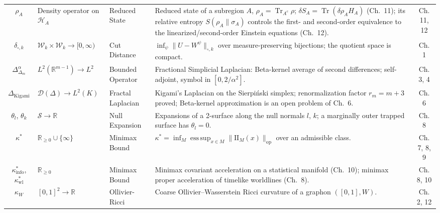 \documentclass[11pt,a4paper,oneside]{article}
\newcommand{\II}{\mathrm{II}}
\begin{document}
\begin{table}[!htbp]
\begin{tabularx}{\textwidth}{@{} c p{3.0cm} p{2.6cm} X c @{}}
$\rho_A$ & Density operator on $\mathcal{H}_A$ & Reduced State & Reduced state of a subregion $A$, $\rho_A = \operatorname{Tr}_{A^c}\rho$; $\delta S_A = \operatorname{Tr}(\delta\rho_A H_A)$ (Ch.~11); its relative entropy $S(\rho_A\|\sigma_A)$ controls the first- and second-order equivalence to the linearized/second-order Einstein equations (Ch.~12). & Ch. 11, 12 \\
$\delta_{\square,k}$ & $\mathcal{W}_k \times \mathcal{W}_k \to [0,\infty)$ & Cut Distance & $\inf_\psi \|U - W^\psi\|_{\square,k}$ over measure-preserving bijections; the quotient space is compact. & Ch. 1 \\
$\Delta_{\Delta_m}^\alpha$ & $L^2(\mathbb{R}^{m-1}) \to L^2$ & Bounded Operator & Fractional Simplicial Laplacian: Beta-kernel average of second differences; self-adjoint, symbol in $[0, 2/\alpha^2]$. & Ch. 3, 4 \\
$\Delta_{\mathrm{Kigami}}$ & $\mathcal{D}(\Delta) \to L^2(K)$ & Fractal Laplacian & Kigami's Laplacian on the Sierpi\'nski simplex; renormalization factor $r_m = m+3$ proved; Beta-kernel approximation is an open problem of Ch.~6. & Ch. 6 \\
$\theta_l$, $\theta_k$ & $\mathcal{S} \to \mathbb{R}$ & Null Expansion & Expansions of a 2-surface along the null normals $l$, $k$; a marginally outer trapped surface has $\theta_l = 0$. & Ch. 8 \\
$\kappa^*$ & $\mathbb{R}_{\ge0} \cup \{\infty\}$ & Minimax Bound & $\kappa^* = \inf_{M} \operatorname{ess\,sup}_{x \in M} \|\II_M(x)\|_{\mathrm{op}}$ over an admissible class. & Ch. 7, 8, 9 \\
$\kappa^*_{\mathrm{info}}$, $\kappa^*_{\mathrm{wl}}$ & $\mathbb{R}_{\ge 0}$ & Minimax Bound & Minimax covariant acceleration on a statistical manifold (Ch.~10); minimax proper acceleration of timelike worldlines (Ch.~8). & Ch. 8, 10 \\
$\kappa_W$ & $[0,1]^2 \to \mathbb{R}$ & Ollivier-Ricci & Coarse Ollivier--Wasserstein Ricci curvature of a graphon $([0,1], W)$. & Ch. 2, 12 \\
\bottomrule
\end{tabularx}
\end{table}
\end{document}
